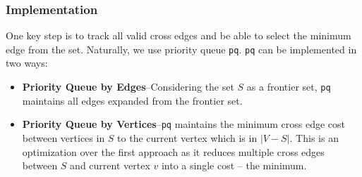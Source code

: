 \documentclass[../main.tex]{subfiles}
\begin{document}
\subsubsection{Implementation} One key step is to track all valid cross edges and be able to select the minimum edge from the set. Naturally, we use priority queue \texttt{pq}. \texttt{pq} can be implemented in two ways:
\begin{itemize}
    \item \textbf{Priority Queue by Edges}--Considering the set $S$ as a frontier set, \texttt{pq} maintains all edges expanded from the frontier set.
    \item \textbf{Priority Queue by Vertices}--\texttt{pq} maintains the minimum cross edge cost between vertices in $S$ to the current vertex which is in $|V-S|$. This is an optimization over the first approach as it reduces multiple cross edges between $S$ and current vertex $v$ into a single cost -- the minimum. 
\end{itemize}
\end{document}
